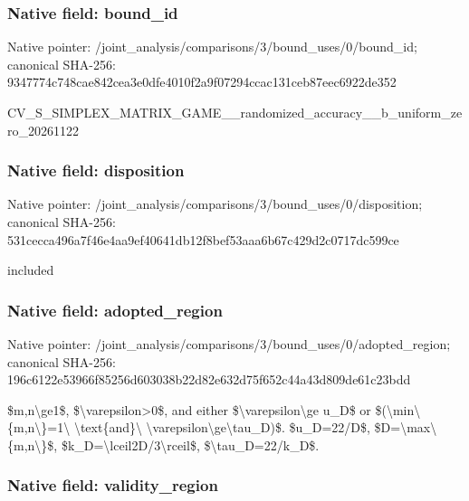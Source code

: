 \documentclass[10pt,a4paper]{article}
\begin{document}
\subsubsection{Native field: bound\_id}


Native pointer: /joint\_analysis/comparis\allowbreak{}ons/3/bound\_uses/0/bound\allowbreak{}\_id; canonical SHA-256: 9347774c748cae842cea3e0d\allowbreak{}fe4010f2a9f07294ccac131c\allowbreak{}eb87eec6922de352


CV\_S\_SIMPLEX\_MATRIX\_GAME\allowbreak{}\_\_randomized\_accuracy\_\_b\allowbreak{}\_uniform\_zero\_20261122


\subsubsection{Native field: disposition}


Native pointer: /joint\_analysis/comparis\allowbreak{}ons/3/bound\_uses/0/dispo\allowbreak{}sition; canonical SHA-256: 531cecca496a7f46e4aa9ef4\allowbreak{}0641db12f8bef53aaa6b67c4\allowbreak{}29d2c0717dc599ce


included


\subsubsection{Native field: adopted\_region}


Native pointer: /joint\_analysis/comparis\allowbreak{}ons/3/bound\_uses/0/adopt\allowbreak{}ed\_region; canonical SHA-256: 196c6122e53966f85256d603\allowbreak{}038b22d82e632d75f652c44a\allowbreak{}43d809de61c23bdd


\$m,n\textbackslash{}ge1\$, \$\textbackslash{}varepsilon>0\$, and either \$\textbackslash{}varepsilon\textbackslash{}ge u\_D\$ or \$(\textbackslash{}min\textbackslash{}\{m,n\textbackslash{}\}=1\textbackslash{} \textbackslash{}text\{and\}\textbackslash{} \textbackslash{}varepsilon\textbackslash{}ge\textbackslash{}tau\_D)\$. \$u\_D=22/D\$, \$D=\textbackslash{}max\textbackslash{}\{m,n\textbackslash{}\}\$, \$k\_D=\textbackslash{}lceil2D/3\textbackslash{}rceil\$, \$\textbackslash{}tau\_D=22/k\_D\$.


\subsubsection{Native field: validity\_region}
\end{document}
